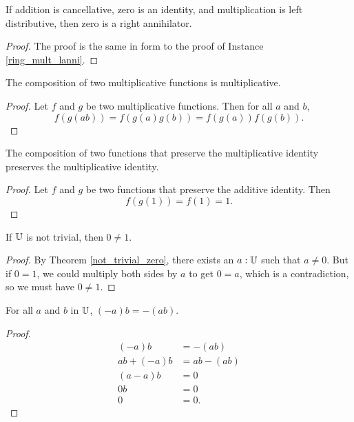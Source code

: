 \documentclass[../../math.tex]{subfiles}
\begin{document}
\begin{instance} \label{ring_mult_ranni}
    If addition is cancellative, zero is an identity, and multiplication is
    left distributive, then zero is a right annihilator.
\end{instance}
\begin{proof}
    The proof is the same in form to the proof of Instance
    \ref{ring_mult_lanni}.
\end{proof}

\begin{instance}
    The composition of two multiplicative functions is multiplicative.
\end{instance}
\begin{proof}
    Let $f$ and $g$ be two multiplicative functions.  Then for all $a$ and $b$,
    \[
        f(g(ab)) = f(g(a)g(b)) = f(g(a))f(g(b)).
    \]
\end{proof}

\begin{instance}
    The composition of two functions that preserve the multiplicative identity
    preserves the multiplicative identity.
\end{instance}
\begin{proof}
    Let $f$ and $g$ be two functions that preserve the additive identity.  Then
    \[
        f(g(1)) = f(1) = 1.
    \]
\end{proof}

\begin{theorem} \label{not_trivial_one}
    If $\mathbb{U}$ is not trivial, then $0 \neq 1$.
\end{theorem}
\begin{proof}
    By Theorem \ref{not_trivial_zero}, there exists an $a : \mathbb{U}$ such that $a
    \neq 0$.  But if $0 = 1$, we could multiply both sides by $a$ to get $0 =
    a$, which is a contradiction, so we must have $0 \neq 1$.
\end{proof}

\begin{theorem}
    For all $a$ and $b$ in $\mathbb{U}$, $(-a)b = -(ab)$.
\end{theorem}
\begin{proof}
    \begin{align*}
        (-a)b &= -(ab) \\
        ab + (-a)b &= ab - (ab) \\
        (a - a)b &= 0 \\
        0b &= 0 \\
        0 &= 0.
    \end{align*}
\end{proof}
\end{document}
